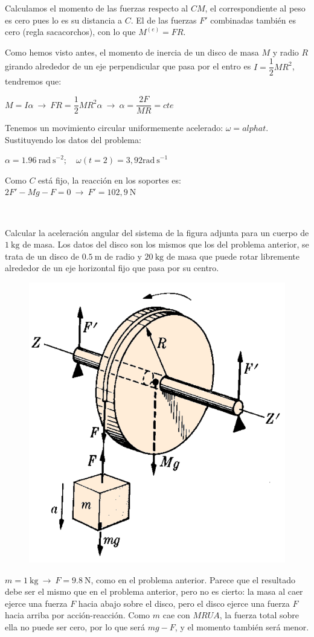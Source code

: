 Calculamos el momento de las fuerzas respecto al $CM$, el correspondiente al peso es cero pues lo es su distancia a $C$. El de las fuerzas $F'$ combinadas también es cero (regla sacacorchos), con lo que $M^{(e)}=FR$.

Como hemos visto antes, el momento de inercia de un disco de masa $M$ y radio $R$ girando alrededor de un eje perpendicular que pasa por el entro es $I=\dfrac 1 2 MR^2$, tendremos que: 

$M=I\alpha \ \to \ FR=\dfrac 1 2 M R^2 \alpha \ \to \ \alpha=\dfrac{2F}{MR}=cte$

Tenemos un movimiento circular uniformemente acelerado: $\omega=	alpha t$. Sustituyendo los datos del problema:

$\alpha = 1.96 \ \mathrm{rad\ s}^{-2};\quad \omega (t=2)=3,92 \mathrm{rad\ s}^{-1}$

Como $C$ está fijo, la reacción en los soportes es: $2F'-Mg-F=0 \ \to \ F'=102,9\ \mathrm{N}$

\vspace{40mm} %
\begin{prob}
\begin{multicols}{2}
$\quad$

Calcular la aceleración angular del sistema de la figura adjunta para un cuerpo de $1\ \mathrm{kg}$ de masa. Los datos del disco son los mismos que los del problema anterior, se trata de un disco de $0.5\ \mathrm{m}$  de radio y $20\ \mathrm{kg}$ de masa	que puede rotar libremente alrededor de un eje horizontal fijo que pasa por su centro.
\begin{figure}[H]
	\centering
	\includegraphics[width=.35\textwidth]{imagenes/imagenes16/T16IM12.png}
\end{figure}	
\end{multicols}
\end{prob}

$m=1\ \mathrm{kg} \ \to \ F=9.8\ \mathrm{N}$, como en el problema anterior. Parece que el resultado debe ser el mismo que en el problema anterior, pero no es cierto: la masa al caer ejerce una fuerza $F$ hacia abajo sobre el disco, pero el disco ejerce una fuerza $F$ hacia arriba por acción-reacción. Como $m$ cae con $MRUA$, la fuerza total sobre ella no puede ser cero, por lo que será $mg-F$, y el momento también será menor.

